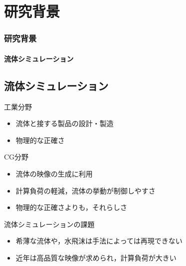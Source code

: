 \documentclass[aspectratio=169,dvipdfmx,hyperref={bookmarks=true}]{beamer}
\begin{document}
   \section{研究背景}
 \begin{frame}
 \frametitle{研究背景}
   \framesubtitle{流体シミュレーション}
 \subsection{流体シミュレーション}
  \begin{block}{工業分野}
  \begin{itemize}
	\item 流体と接する製品の設計・製造
	\item 物理的な正確さ
\end{itemize}
\end{block}
\begin{block}{CG分野}
\begin{itemize}
	\item 流体の映像の生成に利用
	\item 計算負荷の軽減，流体の挙動が制御しやすさ
	\item 物理的な正確さよりも，それらしさ
\end{itemize}
\end{block}

 \begin{block}{流体シミュレーションの課題}
  \begin{itemize}
\item 希薄な流体や，水飛沫は手法によっては再現できない
\item 近年は高品質な映像が求められ，計算負荷が大きい
\end{itemize}
\end{block}
 \end{frame}
\end{document}
